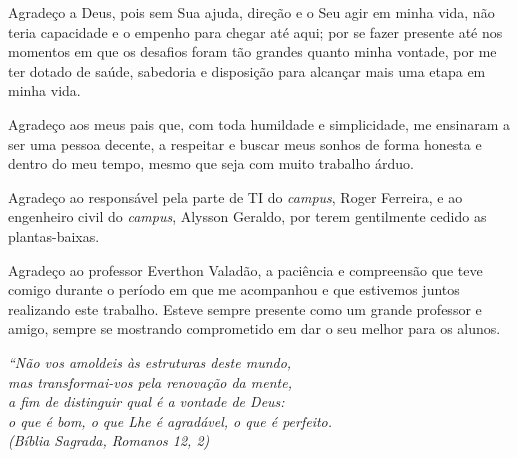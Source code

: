 \documentclass[
	12pt,				%
	openright,			%
	twoside,			%
	a4paper,			%
	english,			%
	french,				%
	spanish,			%
	brazil				%
	]{abntex2}
\begin{document}
\begin{agradecimentos}

Agradeço a Deus, pois sem Sua ajuda, direção e o Seu agir em minha vida, não teria capacidade e o empenho para chegar até aqui; por se fazer presente até nos momentos em que os desafios foram tão grandes quanto minha vontade, por me ter dotado de saúde, sabedoria e disposição para alcançar mais uma etapa em minha vida.

Agradeço aos meus pais que, com toda humildade e simplicidade, me ensinaram a ser uma pessoa decente, a respeitar e buscar meus sonhos de forma honesta e dentro do meu tempo, mesmo que seja com muito trabalho árduo. 

Agradeço ao responsável pela parte de TI do \textit{campus}, Roger Ferreira, e ao engenheiro civil do \textit{campus}, Alysson Geraldo, por terem gentilmente cedido as plantas-baixas.

Agradeço ao professor Everthon Valadão, a paciência e compreensão que teve comigo durante o período em que me acompanhou e que estivemos juntos realizando este trabalho. Esteve sempre presente como um grande professor e amigo, sempre se mostrando comprometido em dar o seu melhor para os alunos. 


\end{agradecimentos}

\begin{epigrafe}
    \vspace*{\fill}
	\begin{flushright}
		\textit{``Não vos amoldeis às estruturas deste mundo, \\
		mas transformai-vos pela renovação da mente, \\
		a fim de distinguir qual é a vontade de Deus: \\
		o que é bom, o que Lhe é agradável, o que é perfeito.\\
		(Bíblia Sagrada, Romanos 12, 2)}
	\end{flushright}
\end{epigrafe}

\end{document}
